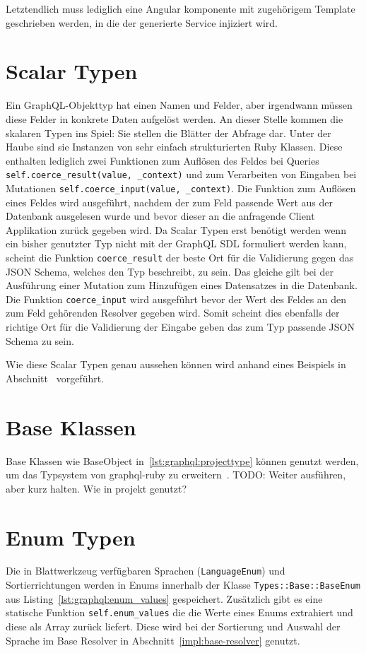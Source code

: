 Letztendlich muss lediglich eine Angular komponente mit zugehörigem Template geschrieben werden, in die der generierte Service injiziert wird.

\section{Scalar Typen}
\label{graphql:scalartypes}
Ein GraphQL-Objekttyp hat einen Namen und Felder, aber irgendwann müssen diese Felder in konkrete Daten aufgelöst werden. An dieser Stelle kommen die skalaren Typen ins Spiel: Sie stellen die Blätter der Abfrage dar. 
Unter der Haube sind sie Instanzen von sehr einfach strukturierten Ruby Klassen. Diese enthalten lediglich zwei Funktionen zum Auflösen des Feldes bei Queries \lstinline|self.coerce_result(value, _context)| und zum Verarbeiten von Eingaben bei Mutationen \lstinline|self.coerce_input(value, _context)|. Die Funktion zum Auflösen eines Feldes wird ausgeführt, nachdem der zum Feld passende Wert aus der Datenbank ausgelesen wurde und bevor dieser an die anfragende Client Applikation zurück gegeben wird. Da Scalar Typen erst benötigt werden wenn ein bisher genutzter Typ nicht mit der GraphQL SDL formuliert werden kann, scheint die Funktion \lstinline|coerce_result| der beste Ort für die Validierung gegen das JSON Schema, welches den Typ beschreibt, zu sein. Das gleiche gilt bei der Ausführung einer Mutation zum Hinzufügen eines Datensatzes in die Datenbank. Die Funktion \lstinline|coerce_input| wird ausgeführt bevor der Wert des Feldes an den zum Feld gehörenden Resolver gegeben wird. Somit scheint dies ebenfalls der richtige Ort für die Validierung der Eingabe geben das zum Typ passende JSON Schema zu sein.

Wie diese Scalar Typen genau aussehen können wird anhand eines Beispiels in Abschnitt~ vorgeführt.

\section{Base Klassen}
\label{graphql:baseclass}
Base Klassen wie BaseObject in~\ref{lst:graphql:projecttype} können genutzt werden, um das Typsystem von graphql-ruby zu erweitern~\cite{graphql-extending}. 
TODO: Weiter ausführen, aber kurz halten. Wie in projekt genutzt?

\section{Enum Typen}
\label{graphql:enumtypes}
Die in Blattwerkzeug verfügbaren Sprachen (\lstinline|LanguageEnum|) und Sortierrichtungen werden in Enums innerhalb der Klasse \lstinline|Types::Base::BaseEnum| aus Listing~\ref{lst:graphql:enum_values} gespeichert. Zusätzlich gibt es eine statische Funktion \lstinline|self.enum_values| die die Werte eines Enums extrahiert und diese als Array zurück liefert. Diese wird bei der Sortierung und Auswahl der Sprache im Base Resolver in Abschnitt~\ref{impl:base-resolver} genutzt.

